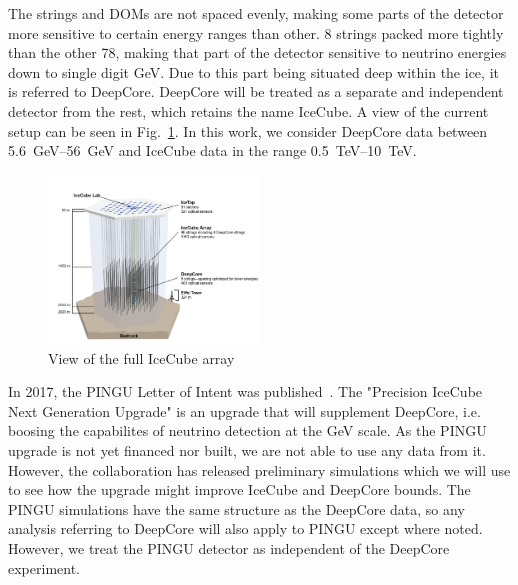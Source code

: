 \documentclass{thesis}
\begin{document}
The strings and DOMs are not spaced evenly, making some parts of the detector more sensitive to certain energy ranges than other.
8 strings packed more tightly than the other 78, making that part of the detector sensitive to neutrino energies down to single digit \si{\GeV}. Due to 
this part being situated deep within the ice, it is referred to DeepCore. DeepCore will be treated as a separate and independent detector from the rest, which
retains the name IceCube. A view of the current setup can be seen in Fig.~\ref{fig:array}. In this work, we consider DeepCore data between \SIrange{5.6}{56}{\GeV} and IceCube data in the range \SIrange{0.5}{10}{\TeV}.
\begin{figure}\label{fig:array}
    \includegraphics[width=0.5\textwidth]{figures/icecube2.png}\caption{View of the full IceCube array}
\end{figure}

In 2017, the PINGU Letter of Intent was published~\cite{PINGUletter}. The "Precision IceCube Next Generation Upgrade" is an upgrade that will 
supplement DeepCore, i.e. boosing the capabilites of neutrino detection at the \si{\GeV} scale. As the PINGU upgrade is not yet financed nor built, we are
not able to use any data from it. However, the collaboration has released preliminary simulations which we will use to see how the upgrade might improve
IceCube and DeepCore bounds. The PINGU simulations have the same structure as the DeepCore data, so any analysis referring to DeepCore will
also apply to PINGU except where noted. However, we treat the PINGU detector as independent of the DeepCore experiment.


\end{document}
